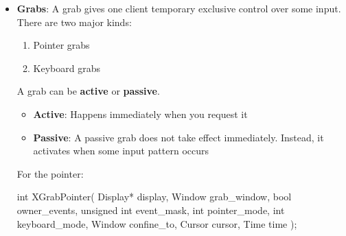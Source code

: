 \documentclass{report}
\begin{document}
\begin{itemize}
            \bigbreak \noindent 
            The main events are 
            \bigbreak \noindent 
            \begin{cppcode}
            SelectionClear
            SelectionRequest
            SelectionNotify
            \end{cppcode}
            \begin{itemize}
                \item \textbf{SelectionClear}: You lost ownership of the selection.
                \item \textbf{SelectionRequest}: Another client is asking you for the selection data.
                \item \textbf{SelectionNotify}: The selection conversion request completed.
            \end{itemize}
            A correct clipboard owner must handle \textbf{SelectionRequest.} If it exits, the selected data may disappear unless a clipboard manager has saved it.           
        \item \textbf{Grabs}: A grab gives one client temporary exclusive control over some input.
            \bigbreak \noindent 
            There are two major kinds:
            \begin{enumerate}
                \item Pointer grabs
                \item Keyboard grabs
            \end{enumerate}
            A grab can be \textbf{active} or \textbf{passive}. 
            \begin{itemize}
                \item \textbf{Active}: Happens immediately when you request it 
                \item \textbf{Passive}: A passive grab does not take effect immediately. Instead, it activates when some input pattern occurs
            \end{itemize}
            For the pointer:
            \bigbreak \noindent 
            \begin{cppcode}
            int XGrabPointer(
                Display* display,
                Window grab_window,
                bool owner_events,
                unsigned int event_mask,
                int pointer_mode,
                int keyboard_mode,
                Window confine_to,
                Cursor cursor,
                Time time
            );
            \end{cppcode}
            \begin{itemize}

\end{itemize}
\end{itemize}
\end{document}
